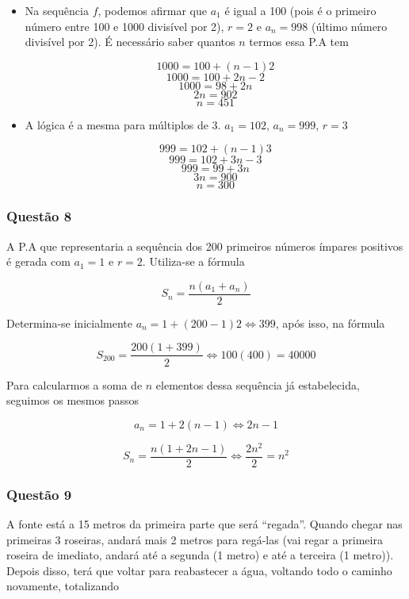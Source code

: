 \documentclass[11pt]{article}
\begin{document}
\begin{itemize}
  \item Na sequência $f$, podemos afirmar que $a_{1}$ é igual a 100 (pois é o primeiro número entre 100 e 1000 divisível por 2), $r = 2$ e $a_{n} = 998$ (último número divisível por 2). É necessário saber quantos $n$ termos essa P.A tem

        \[1000 = 100 + (n - 1)2\]
        \[1000 = 100 + 2n - 2\]
        \[1000 = 98 + 2n\]
        \[2n = 902\]
        \[n = 451\]

  \item A lógica é a mesma para múltiplos de 3. $a_{1} = 102$, $a_{n} = 999$, $r = 3$

        \[999 = 102 + (n - 1)3\]
        \[999 = 102 + 3n - 3\]
        \[999 = 99 + 3n\]
        \[3n = 900\]
        \[n = 300\]
\end{itemize}

\subsubsection{Questão 8}

A P.A que representaria a sequência dos 200 primeiros números ímpares positivos é gerada com $a_{1} = 1$ e $r = 2$. Utiliza-se a fórmula

\[S_{n} = \frac{n(a_{1} + a_{n})}{2}\]

Determina-se inicialmente $a_{n} = 1 + (200 - 1)2 \Leftrightarrow 399$, após isso, na fórmula

\[S_{200} = \frac{200(1 + 399)}{2} \Leftrightarrow 100(400) = 40000\]

Para calcularmos a soma de $n$ elementos dessa sequência já estabelecida, seguimos os mesmos passos

\[a_{n} = 1 + 2(n - 1) \Leftrightarrow 2n - 1\]

\[S_{n} = \frac{n(1 + 2n - 1)}{2} \Leftrightarrow \frac{2n^{2}}{2} = n^{2}\]

\subsubsection{Questão 9}

A fonte está a 15 metros da primeira parte que será ``regada''. Quando chegar nas primeiras 3 roseiras, andará mais 2 metros para regá-las (vai regar a primeira roseira de imediato, andará até a segunda (1 metro) e até a terceira (1 metro)). Depois disso, terá que voltar para reabastecer a água, voltando todo o caminho novamente, totalizando
\end{document}
